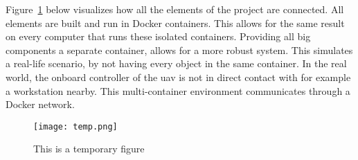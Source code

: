 Figure~\ref{fig:temp} below visualizes how all the elements of the project are connected. All elements are built and run in Docker containers. This allows for the same result on every computer that runs these isolated containers. Providing all big components a separate container, allows for a more robust system. This simulates a real\hyp{}life scenario, by not having every object in the same container. In the real world, the onboard controller of the \acs{uav} is not in direct contact with for example a workstation nearby. This multi\hyp{}container environment communicates through a Docker network.

\begin{figure}[!h]
  \centering
  \texttt{[image: temp.png]}
  \caption{This is a temporary figure}
  \label{fig:temp}
\end{figure}